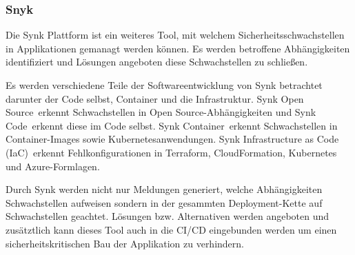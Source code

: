 \subsubsection{Snyk} \label{sec:Snyk}
Die Synk Plattform ist ein weiteres Tool, mit welchem Sicherheitsschwachstellen in Applikationen gemanagt werden können.
Es werden betroffene Abhängigkeiten identifiziert und Lösungen angeboten diese Schwachstellen zu schließen.

Es werden verschiedene Teile der Softwareentwicklung von Synk betrachtet darunter der Code selbst, Container und die Infrastruktur.
\glqq Synk Open Source\grqq~erkennt Schwachstellen in \glqq Open Source\grqq-Abhängigkeiten und \glqq Synk Code\grqq~erkennt diese im Code selbst.
\glqq Synk Container\grqq~erkennt Schwachstellen in Container-Images sowie Kubernetesanwendungen.
\glqq Synk Infrastructure as Code (IaC)\grqq~erkennt Fehlkonfigurationen in Terraform, CloudFormation, Kubernetes und Azure-Formlagen.

Durch Synk werden nicht nur Meldungen generiert, welche Abhängigkeiten Schwachstellen aufweisen sondern in der gesammten Deployment-Kette auf Schwachstellen geachtet.
Lösungen bzw. Alternativen werden angeboten und zusätztlich kann dieses Tool auch in die CI/CD eingebunden werden um einen sicherheitskritischen Bau der Applikation zu verhindern.   